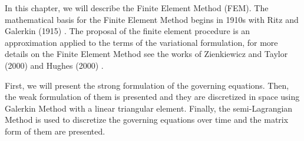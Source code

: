 In this chapter, we will describe the Finite Element Method (FEM). 
The mathematical basis for the Finite Element Method begins in 1910s
 with Ritz \cite{ritz1909} and Galerkin (1915) \cite{galerkin1915}.
The proposal of the finite element procedure is 
an approximation applied to the terms of the 
variational formulation, 
for more details on the Finite Element Method see the works of 
Zienkiewicz and Taylor (2000) \cite{zienkiewiczvol3} and
Hughes (2000) \cite{hughes2000}.
\par

First, we will present the strong formulation of the
governing equations. 
Then, the weak formulation of them is 
presented and they are discretized in space using Galerkin Method 
with a linear triangular element. 
Finally, the semi-Lagrangian Method is used to discretize
the governing equations over time and the matrix form
of them are presented.
